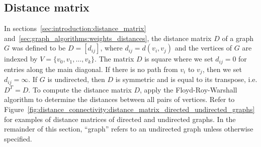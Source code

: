 
\subsection{Distance matrix}

In sections~\ref{sec:introduction:distance_matrix}
and~\ref{sec:graph_algorithms:weights_distances}, the distance matrix
$D$ of a graph $G$ was defined to be $D = [d_{ij}]$, where
$d_{ij} = d(v_i, v_j)$ and the vertices of $G$ are indexed by
$V = \{v_0, v_1, \dots, v_k\}$. The matrix $D$ is square where we set
$d_{ij} = 0$ for entries along the main diagonal. If there is no path
from $v_i$ to $v_j$, then we set $d_{ij} = \infty$. If $G$ is
undirected, then $D$ is symmetric and is equal to its transpose,
i.e. $D^T = D$. To compute the distance matrix $D$, apply the
Floyd-Roy-Warshall algorithm to
determine the distances between all pairs of vertices. Refer to
Figure~\ref{fig:distance_connectivity:distance_matrix_directed_undirected_graphs}
for examples of distance matrices of directed and undirected
graphs. In the remainder of this section, ``graph'' refers to an
undirected graph unless otherwise specified.

